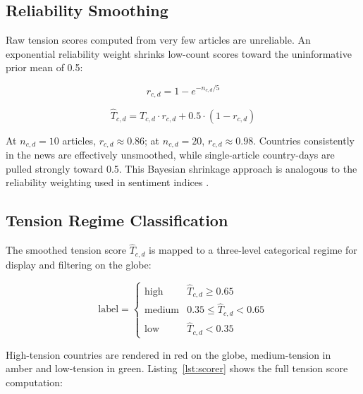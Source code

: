 \documentclass[12pt,a4paper]{report}
\begin{document}
\subsection{Reliability Smoothing}

Raw tension scores computed from very few articles are unreliable. An
exponential reliability weight shrinks low-count scores toward the
uninformative prior mean of 0.5:

\begin{equation}
  r_{c,d} = 1 - e^{-n_{c,d}/5}
  \label{eq:reliability}
\end{equation}

\begin{equation}
  \hat{T}_{c,d} = T_{c,d} \cdot r_{c,d} + 0.5 \cdot (1 - r_{c,d})
  \label{eq:smoothed}
\end{equation}

At $n_{c,d} = 10$ articles, $r_{c,d} \approx 0.86$; at $n_{c,d} = 20$,
$r_{c,d} \approx 0.98$. Countries consistently in the news are
effectively unsmoothed, while single-article country-days are pulled
strongly toward 0.5. This Bayesian shrinkage approach is analogous to
the reliability weighting used in sentiment indices \cite{tetlock2007}.

\subsection{Tension Regime Classification}

The smoothed tension score $\hat{T}_{c,d}$ is mapped to a three-level
categorical regime for display and filtering on the globe:

\begin{equation}
  \text{label} =
  \begin{cases}
    \text{high}   & \hat{T}_{c,d} \geq 0.65 \\
    \text{medium} & 0.35 \leq \hat{T}_{c,d} < 0.65 \\
    \text{low}    & \hat{T}_{c,d} < 0.35
  \end{cases}
\end{equation}

High-tension countries are rendered in red on the globe, medium-tension
in amber and low-tension in green. Listing~\ref{lst:scorer} shows the
full tension score computation:
\end{document}
